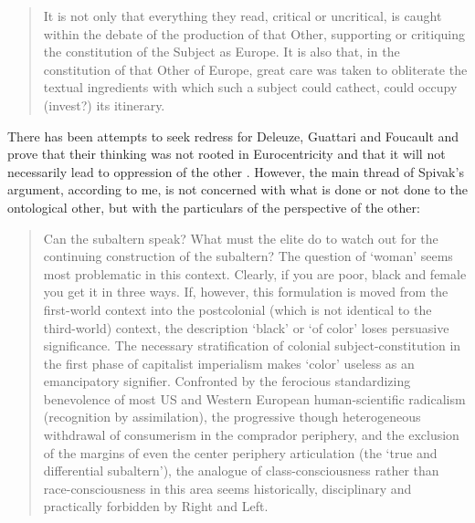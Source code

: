 \documentclass[a4paper]{article}
\begin{document}
\begin{quote}
   It is not only that everything they read, critical or uncritical, is caught within the debate   of the production of that Other, supporting or critiquing the constitution of the Subject as   Europe.  It is also that, in the constitution of that Other of Europe, great care was taken to   obliterate the textual ingredients with which such a subject could cathect, could occupy (invest?) its   itinerary. \citep[p. 75]{spivak1988}
\end{quote}

There has been attempts to seek redress for Deleuze, Guattari and Foucault and prove that their thinking was not rooted in Eurocentricity and that it will not necessarily lead to oppression of the other \citep[e.g.][]{robinson2010}. However, the main thread of Spivak's argument, according to me, is not concerned with what is done or not done to the ontological other, but with the particulars of the perspective of the other:

\begin{quote}
Can the subaltern speak? What must the elite do to watch out for the continuing construction   of the subaltern? The question of `woman' seems most problematic in this context. Clearly, if   you are poor, black and female you get it in three ways. If, however, this formulation is   moved from the first-world context into the postcolonial (which is not identical to the   third-world) context, the description `black' or `of color' loses persuasive   significance. The necessary stratification of colonial subject-constitution in the first phase   of capitalist imperialism makes `color' useless as an emancipatory signifier. Confronted by   the ferocious standardizing benevolence of most US and Western European human-scientific   radicalism (recognition by assimilation), the progressive though heterogeneous withdrawal of   consumerism in the comprador periphery, and the exclusion of the margins of even the center   periphery articulation (the `true and differential subaltern'), the analogue of   class-consciousness rather than race-consciousness in this area seems historically,   disciplinary and practically forbidden by Right and Left. \citep[p. 90]{spivak1988}
\end{quote}
\end{document}
